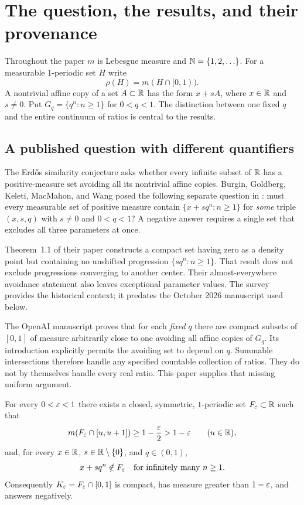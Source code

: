 \section{The question, the results, and their provenance}
\label{sec:context}

Throughout the paper $m$ is Lebesgue measure and $\mathbb N=\{1,2,\ldots\}$.
For a measurable $1$-periodic set $H$ write
\[
 \rho(H)=m(H\cap[0,1)).
\]
A nontrivial affine copy of a set $A\subset\mathbb R$ has the form $x+sA$,
where $x\in\mathbb R$ and $s\ne0$. Put $G_q=\{q^n:n\ge1\}$ for $0<q<1$.
The distinction between one fixed $q$ and the entire continuum of ratios
is central to the results.

\subsection{A published question with different quantifiers}

The Erd\H{o}s similarity conjecture asks whether every infinite subset of
$\mathbb R$ has a positive-measure set avoiding all its nontrivial affine copies.
Burgin, Goldberg, Keleti, MacMahon, and Wang posed the following separate
question in \cite[Question~1]{BGKMW}: must every measurable set of positive
measure contain $\{x+sq^n:n\ge1\}$ for \emph{some} triple $(x,s,q)$ with
$s\ne0$ and $0<q<1$? A negative answer requires a single set that excludes
all three parameters at once.

Theorem~1.1 of their paper constructs a compact set having zero as a density
point but containing no unshifted progression $\{sq^n:n\ge1\}$. That result
does not exclude progressions converging to another center. Their
almost-everywhere avoidance statement also leaves exceptional parameter
values. The survey \cite{JLM} provides the historical context; it predates
the October 2026 manuscript used below.

The OpenAI manuscript \cite[Theorem~1.1]{OpenAI84} proves that for each
\emph{fixed} $q$ there are compact subsets of $[0,1]$ of measure arbitrarily
close to one avoiding all affine copies of $G_q$. Its introduction explicitly
permits the avoiding set to depend on $q$. Summable intersections therefore
handle any specified countable collection of ratios. They do not by
themselves handle every real ratio. This paper supplies that missing
uniform argument.

\begin{theorem}\label{thm:main}
For every $0<\varepsilon<1$ there exists a closed, symmetric, $1$-periodic set
$F_\varepsilon\subset\mathbb R$ such that
\begin{equation}\label{eq:main-density}
 m(F_\varepsilon\cap[u,u+1])\ge1-\frac{\varepsilon}2>1-\varepsilon
 \qquad(u\in\mathbb R),
\end{equation}
and, for every $x\in\mathbb R$, $s\in\mathbb R\setminus\{0\}$, and $q\in(0,1)$,
\begin{equation}\label{eq:main-avoidance}
 x+sq^n\notin F_\varepsilon\quad\text{for infinitely many }n\ge1.
\end{equation}
Consequently $K_\varepsilon=F_\varepsilon\cap[0,1]$ is compact, has measure greater
than $1-\varepsilon$, and answers \cite[Question~1]{BGKMW} negatively.
\end{theorem}

